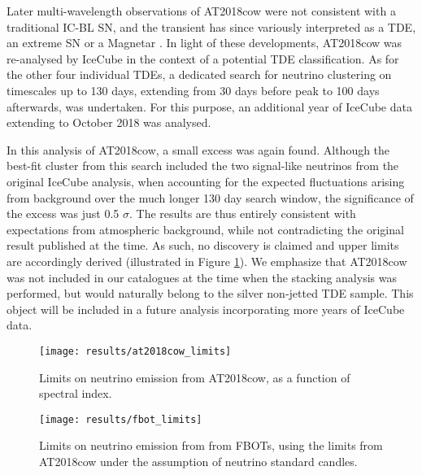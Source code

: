 Later multi-wavelength observations of AT2018cow were not consistent with a traditional IC-BL SN, and the transient has since variously interpreted as a TDE, an extreme SN or a Magnetar . In light of these developments, AT2018cow was re-analysed by IceCube in the context of a potential TDE classification. As for the other four individual TDEs, a dedicated search for neutrino clustering on timescales up to 130 days, extending from 30 days before peak to 100 days afterwards, was undertaken.  For this purpose, an additional year of IceCube data extending to October 2018 was analysed.

In this analysis of AT2018cow, a small excess was again found. Although the best-fit cluster from this search included the two signal-like neutrinos from the original IceCube analysis, when accounting for the expected fluctuations arising from background over the much longer 130 day search window, the significance of the excess was just 0.5 $\sigma$. The results are thus entirely consistent with expectations from atmospheric background, while not contradicting the original result published at the time. As such, no discovery is claimed and upper limits are accordingly derived (illustrated in Figure \ref{fig:at2018cow_limits}). We emphasize that AT2018cow was not included in our catalogues at the time when the stacking analysis was performed, but would naturally belong to the silver non-jetted TDE sample. This object will be included in a future analysis incorporating more years of IceCube data.

\begin{figure}[!ht]
	\centering \texttt{[image: results/at2018cow\_limits]}
	\caption{Limits on neutrino emission from AT2018cow, as a function of spectral index.}
	\label{fig:at2018cow_limits}
\end{figure}

\begin{figure}[!ht]
	\centering \texttt{[image: results/fbot\_limits]}
	\caption{Limits on neutrino emission from from FBOTs, using the limits from AT2018cow under the assumption of neutrino standard candles.}
	\label{fig:fbot_limits}
\end{figure}